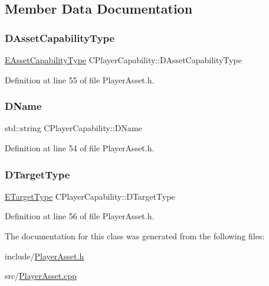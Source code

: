 \subsection{Member Data Documentation}
\hypertarget{classCPlayerCapability_a09011bc8c74c698bfb65f06a1840c6e1}{}\label{classCPlayerCapability_a09011bc8c74c698bfb65f06a1840c6e1} 
\subsubsection{\texorpdfstring{D\+Asset\+Capability\+Type}{DAssetCapabilityType}}
{\footnotesize\ttfamily \hyperlink{GameDataTypes_8h_a35b98ce26aca678b03c6f9f76e4778ce}{E\+Asset\+Capability\+Type} C\+Player\+Capability\+::\+D\+Asset\+Capability\+Type\hspace{0.3cm}{\ttfamily [protected]}}



Definition at line 55 of file Player\+Asset.\+h.

\hypertarget{classCPlayerCapability_aae795f4ae4c19a9c7792a4101ca18560}{}\label{classCPlayerCapability_aae795f4ae4c19a9c7792a4101ca18560} 
\subsubsection{\texorpdfstring{D\+Name}{DName}}
{\footnotesize\ttfamily std\+::string C\+Player\+Capability\+::\+D\+Name\hspace{0.3cm}{\ttfamily [protected]}}



Definition at line 54 of file Player\+Asset.\+h.

\hypertarget{classCPlayerCapability_af3e2c3d386fbdce314d36e3e16ee823c}{}\label{classCPlayerCapability_af3e2c3d386fbdce314d36e3e16ee823c} 
\subsubsection{\texorpdfstring{D\+Target\+Type}{DTargetType}}
{\footnotesize\ttfamily \hyperlink{classCPlayerCapability_a9d3450ed1532fd536bd6cbb1e2eef02f}{E\+Target\+Type} C\+Player\+Capability\+::\+D\+Target\+Type\hspace{0.3cm}{\ttfamily [protected]}}



Definition at line 56 of file Player\+Asset.\+h.



The documentation for this class was generated from the following files\+:\begin{DoxyCompactItemize}
\item 
include/\hyperlink{PlayerAsset_8h}{Player\+Asset.\+h}\item 
src/\hyperlink{PlayerAsset_8cpp}{Player\+Asset.\+cpp}\end{DoxyCompactItemize}
